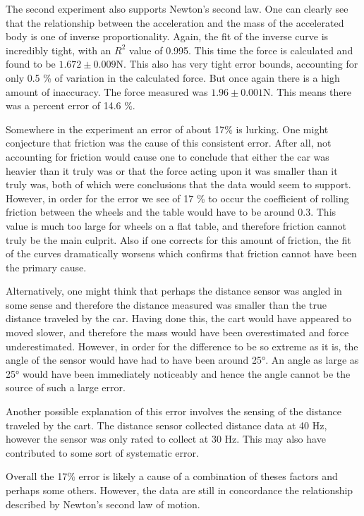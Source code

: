 \documentclass[11pt]{article}
\begin{document}
The second experiment also supports Newton's second law. One can clearly see that the relationship between the acceleration and the mass of the accelerated body is one of inverse proportionality. Again, the fit of the inverse curve is incredibly tight, with an \(R^2\) value of 0.995. This time the force is calculated and found to be \(1.672 \pm 0.009 \)N. This also has very tight error bounds, accounting for only 0.5 \% of variation in the calculated force. But once again there is a high amount of inaccuracy. The force measured was \(1.96 \pm 0.001 \)N. This means there was a percent error of 14.6 \%.

Somewhere in the experiment an error of about 17\% is lurking. One might conjecture that friction was the cause of this consistent error. After all, not accounting for friction would cause one to conclude that either the car was heavier than it truly was or that the force acting upon it was smaller than it truly was, both of which were conclusions that the data would seem to support. However, in order for the error we see of 17 \% to occur the coefficient of rolling friction between the wheels and the table would have to be around 0.3. This value is much too large for wheels on a flat table, and therefore friction cannot truly be the main culprit. Also if one corrects for this amount of friction, the fit of the curves dramatically worsens which confirms that friction cannot have been the primary cause.

 Alternatively, one might think that perhaps the distance sensor was angled in some sense and therefore the distance measured was smaller than the true distance traveled by the car. Having done this, the cart would have appeared to moved slower, and therefore the mass would have been overestimated and force underestimated. However, in order for the difference to be so extreme as it is, the angle of the sensor would have had to have been around \ang{25}. An angle as large as \ang{25} would have been immediately noticeably and hence the angle cannot be the source of such a large error.
 
 Another possible explanation of this error involves the sensing of the distance traveled by the cart. The distance sensor collected distance data at 40 Hz, however the sensor was only rated to collect at 30 Hz. This may also have contributed to some sort of systematic error.
 
 Overall the 17\% error is likely a cause of a combination of theses factors and perhaps some others. However, the data are still in concordance the relationship described by Newton's second law of motion.
\end{document}
